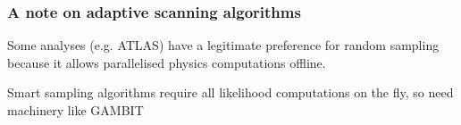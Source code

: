 \documentclass[aspectratio=169]{beamer}
\begin{document}
\begin{frame}
    \frametitle{A note on adaptive scanning algorithms}
    Some analyses (e.g. ATLAS) have a legitimate preference for random sampling because it allows parallelised physics computations offline.

    Smart sampling algorithms require all likelihood computations on the fly, so need machinery like GAMBIT
\end{frame}
\end{document}
